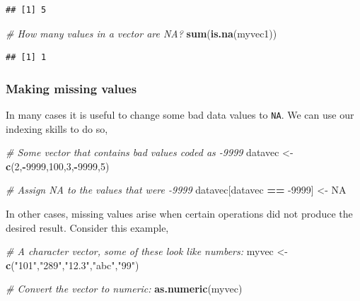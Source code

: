 \documentclass[]{book}
\newenvironment{Shaded}{\begin{snugshade}}{\end{snugshade}}
\newcommand{\CommentTok}[1]{\textcolor[rgb]{0.56,0.35,0.01}{\textit{#1}}}
\newcommand{\DecValTok}[1]{\textcolor[rgb]{0.00,0.00,0.81}{#1}}
\newcommand{\KeywordTok}[1]{\textcolor[rgb]{0.13,0.29,0.53}{\textbf{#1}}}
\newcommand{\NormalTok}[1]{#1}
\newcommand{\OperatorTok}[1]{\textcolor[rgb]{0.81,0.36,0.00}{\textbf{#1}}}
\newcommand{\OtherTok}[1]{\textcolor[rgb]{0.56,0.35,0.01}{#1}}
\newcommand{\StringTok}[1]{\textcolor[rgb]{0.31,0.60,0.02}{#1}}
\begin{document}
\begin{verbatim}
## [1] 5
\end{verbatim}

\begin{Shaded}
\begin{Highlighting}[]
\CommentTok{# How many values in a vector are NA?}
\KeywordTok{sum}\NormalTok{(}\KeywordTok{is.na}\NormalTok{(myvec1))  }
\end{Highlighting}
\end{Shaded}

\begin{verbatim}
## [1] 1
\end{verbatim}

\hypertarget{making-missing-values}{%
\subsubsection{Making missing values}\label{making-missing-values}}

In many cases it is useful to change some bad data values to \texttt{NA}. We can use our indexing skills to do so,

\begin{Shaded}
\begin{Highlighting}[]
\CommentTok{# Some vector that contains bad values coded as -9999}
\NormalTok{datavec <-}\StringTok{ }\KeywordTok{c}\NormalTok{(}\DecValTok{2}\NormalTok{,}\OperatorTok{-}\DecValTok{9999}\NormalTok{,}\DecValTok{100}\NormalTok{,}\DecValTok{3}\NormalTok{,}\OperatorTok{-}\DecValTok{9999}\NormalTok{,}\DecValTok{5}\NormalTok{)}

\CommentTok{# Assign NA to the values that were -9999}
\NormalTok{datavec[datavec }\OperatorTok{==}\StringTok{ }\DecValTok{-9999}\NormalTok{] <-}\StringTok{ }\OtherTok{NA} 
\end{Highlighting}
\end{Shaded}

In other cases, missing values arise when certain operations did not produce the desired result. Consider this example,

\begin{Shaded}
\begin{Highlighting}[]
\CommentTok{# A character vector, some of these look like numbers:}
\NormalTok{myvec <-}\StringTok{ }\KeywordTok{c}\NormalTok{(}\StringTok{"101"}\NormalTok{,}\StringTok{"289"}\NormalTok{,}\StringTok{"12.3"}\NormalTok{,}\StringTok{"abc"}\NormalTok{,}\StringTok{"99"}\NormalTok{)}

\CommentTok{# Convert the vector to numeric:}
\KeywordTok{as.numeric}\NormalTok{(myvec)}
\end{Highlighting}
\end{Shaded}
\end{document}
